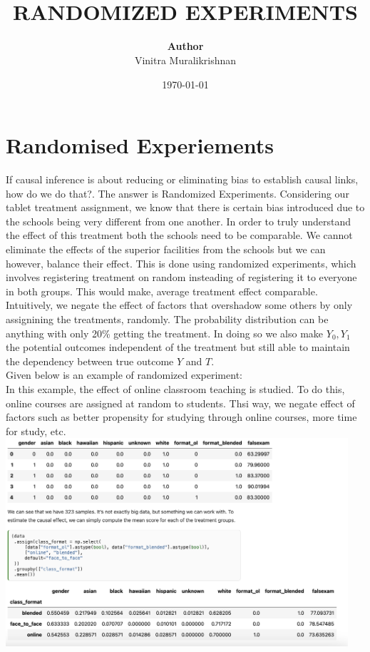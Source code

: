 \documentclass{article}
\begin{document}
\title{ \normalsize \textsc{}
		\\ [2.0cm]
		\LARGE \textbf{\uppercase{Randomized Experiments}
        }
		}
\date{\today}

\author{\textbf{Author} \\ 
		Vinitra Muralikrishnan}

{\let\newpage\relax\maketitle}
\tableofcontents
\newpage

\section{Randomised Experiements}
If causal inference is about reducing or eliminating bias to establish causal links, how do we do that?. The answer is Randomized 
Experiments. Considering our tablet treatment assignment, we know that there is certain bias introduced due to the schools being
very different from one another. In order to truly understand the effect of this treatment both the schools need to be comparable.
We cannot eliminate the effects of the superior facilities from the schools but we can however, balance their effect. This is done using
randomized experiments, which involves registering treatment on random insteading of registering it to everyone in both groups. This would make,
average treatment effect comparable. Intuitively, we negate the effect of factors that overshadow some others by only assignining the treatments,
randomly. The probability distribution can be anything with only 20\% getting the treatment. In doing so we also make $Y_0, Y_1$ the potential
outcomes independent of the treatment but still able to maintain the dependency between true outcome $Y$ and $T$.\\
Given below is an example of randomized experiment:\\
In this example, the effect of online classroom teaching is studied. To do this, online courses are assigned at random to students. Thsi way,
we negate effect of factors such as better propensity for studying through online courses, more time for study, etc.
\includegraphics[width=5in]{./imgs/ranex-ex.png}\\\\
\end{document}
